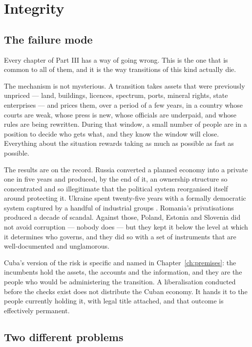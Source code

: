 \chapter{Integrity}
\label{ch:integrity}

\section{The failure mode}

Every chapter of Part III has a way of going wrong. This is the one that is
common to all of them, and it is the way transitions of this kind actually die.

The mechanism is not mysterious. A transition takes assets that were previously
unpriced --- land, buildings, licences, spectrum, ports, mineral rights, state
enterprises --- and prices them, over a period of a few years, in a country whose
courts are weak, whose press is new, whose officials are underpaid, and whose
rules are being rewritten. During that window, a small number of people are in a
position to decide who gets what, and they know the window will close. Everything
about the situation rewards taking as much as possible as fast as possible.

The results are on the record. Russia converted a planned economy into a private
one in five years and produced, by the end of it, an ownership structure so
concentrated and so illegitimate that the political system reorganised itself
around protecting it. Ukraine spent twenty-five years with a formally democratic
system captured by a handful of industrial groups \citep{aslund2013}. Romania's privatisations
produced a decade of scandal. Against those, Poland, Estonia and Slovenia did not
avoid corruption --- nobody does --- but they kept it below the level at which it
determines who governs, and they did so with a set of instruments that are
well-documented and unglamorous.

Cuba's version of the risk is specific and named in
Chapter~\ref{ch:premises}: the incumbents hold the assets, the accounts and the
information, and they are the people who would be administering the transition. A
liberalisation conducted before the checks exist does not distribute the Cuban
economy. It hands it to the people currently holding it, with legal title
attached, and that outcome is effectively permanent.

\section{Two different problems}

